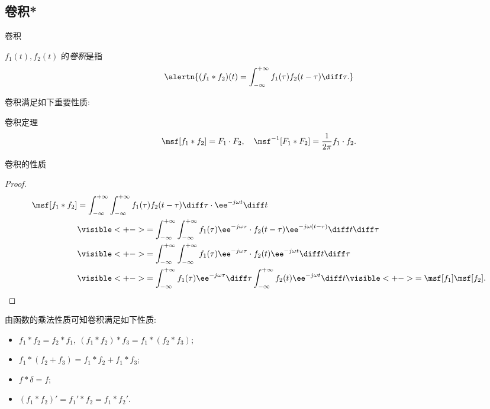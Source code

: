 \subsection{卷积*}
\begin{frame}{卷积\noexer}
	\onslide<+->
	\begin{definition}
		$f_1(t),f_2(t)$ 的\emph{卷积}是指
	\[
		\alertn{(f_1\ast f_2)(t)=\int_{-\infty}^{+\infty} f_1(\tau)f_2(t-\tau)\diff \tau.}
	\]
	\end{definition}
	\onslide<+->
	卷积满足如下重要性质:
	\onslide<+->
	\begin{main}{卷积定理}
	\[\msf[f_1\ast f_2]=F_1\cdot F_2,\quad
	\msf^{-1}[F_1\ast F_2]=\frac1{2\pi}f_1\cdot f_2.
	\]
	\bigdel
	\end{main}
\end{frame}


\begin{frame}{卷积的性质\noexer}
	\onslide<+->
	\begin{proof}
		\bigdel
		\begin{align*}
			\msf[f_1\ast f_2]&=\int_{-\infty}^{+\infty}\int_{-\infty}^{+\infty}f_1(\tau)f_2(t-\tau)\diff \tau \cdot \ee^{-j\omega t}\diff t\\
			&\visible<+->{=\int_{-\infty}^{+\infty}\int_{-\infty}^{+\infty}f_1(\tau)\ee^{-j\omega \tau}\cdot f_2(t-\tau)\ee^{-j\omega (t-\tau)}\diff t\diff \tau}\\
			&\visible<+->{=\int_{-\infty}^{+\infty}\int_{-\infty}^{+\infty}f_1(\tau)\ee^{-j\omega \tau}\cdot f_2(t)\ee^{-j\omega t}\diff t\diff \tau}\\
			&\visible<+->{=\int_{-\infty}^{+\infty}f_1(\tau)\ee^{-j\omega \tau}\diff\tau\int_{-\infty}^{+\infty}f_2(t)\ee^{-j\omega t}\diff t}\visible<+->{=\msf[f_1]\msf[f_2].\qedhere}
		\end{align*}
	\end{proof}
	\onslide<+->
	由函数的乘法性质可知卷积满足如下性质:
	\begin{itemize}\bf
		\item $f_1\ast f_2=f_2\ast f_1,\ (f_1\ast f_2)\ast f_3=f_1\ast(f_2\ast f_3)$;
		\item $f_1\ast(f_2+f_3)=f_1\ast f_2+f_1\ast f_3$;
		\item $f\ast\delta=f$;
		\item $(f_1\ast f_2)'=f_1'\ast f_2=f_1\ast f_2'$.
	\end{itemize}
\end{frame}


